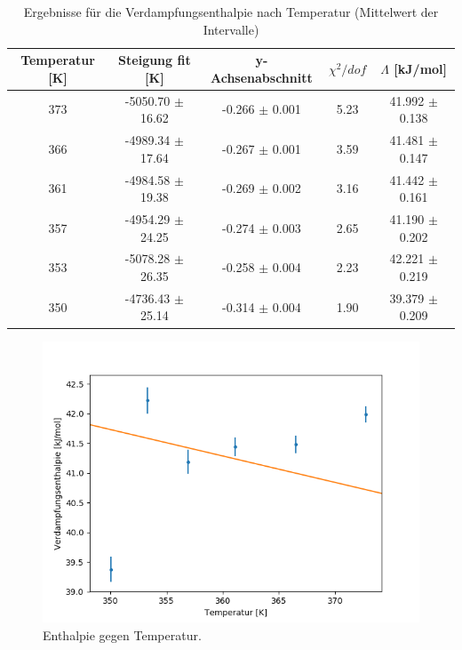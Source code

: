 \documentclass[12pt,a4paper]{article}
\begin{document}
\begin{table}
	\begin{tabular}{|c|c|c|c|c|}
		\hline
		\textbf{Temperatur [K]} & \textbf{Steigung fit [K]} & \textbf{y-Achsenabschnitt} & $\chi ^2/dof$ & \textbf{$\Lambda$ [kJ/mol]} \\
		\hline
		373 & -5050.70 $\pm$ 16.62 & -0.266 $\pm$ 0.001 & 5.23 & 41.992 $\pm$ 0.138 \\
		\hline
		366 & -4989.34 $\pm$ 17.64 & -0.267 $\pm$ 0.001 & 3.59 & 41.481 $\pm$ 0.147 \\
		\hline
		361 & -4984.58 $\pm$ 19.38 & -0.269 $\pm$ 0.002 & 3.16 & 41.442 $\pm$ 0.161 \\
		\hline
		357 & -4954.29 $\pm$ 24.25 & -0.274 $\pm$ 0.003 & 2.65 & 41.190 $\pm$ 0.202 \\
		\hline
		353 & -5078.28 $\pm$ 26.35 & -0.258 $\pm$ 0.004 & 2.23 & 42.221 $\pm$ 0.219 \\
		\hline
		350 & -4736.43 $\pm$ 25.14 & -0.314 $\pm$ 0.004 & 1.90 & 39.379 $\pm$ 0.209 \\
		\hline
	\end{tabular}
	\caption{Ergebnisse für die Verdampfungsenthalpie nach Temperatur (Mittelwert der Intervalle)}
	\label{tab:enthalpie_A}
\end{table}

\begin{figure}
\begin{center}
\includegraphics[width=\linewidth]{Bilder/Enthalpie_gegen_TempA}
\caption{Enthalpie gegen Temperatur.}
\label{fig:EntTempA}
\end{center}
\end{figure}
\end{document}
